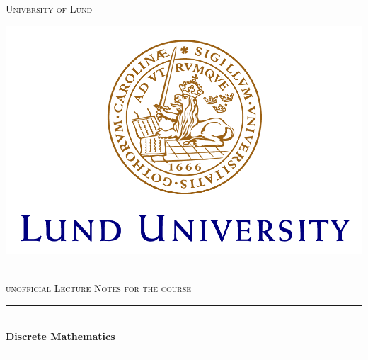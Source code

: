   \begin{titlepage}

    \newcommand{\HRule}{\rule{\linewidth}{0.5mm}} %

    \center %


    \textsc{\LARGE University of Lund}\\[0.5cm] %

    \begin{minipage}[c]{0.8\linewidth}
    \includegraphics[width=\linewidth]{figures/LundUniversity-logo.png}
    \end{minipage} \\
    \textsc{\Large unofficial Lecture Notes for the course}\\[0.5cm] %
    \HRule \\[0.4cm]
    { \LARGE \bfseries \sffamily Discrete Mathematics}\\[0.1cm]
    \HRule \\[0.5cm]


\end{titlepage}
